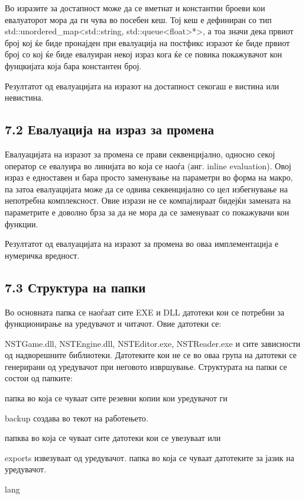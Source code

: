 Во изразите за достапност може да се вметнат и константни броеви кои евалуаторот мора да ги чува во посебен кеш. Тој кеш е дефиниран со тип std::unordered\_map<std::string, std::queue<float>*>, а тоа значи дека првиот број кој ќе биде пронајден при евалуација на постфикс изразот ќе биде првиот број со кој ќе биде евалуиран некој израз кога ќе се повика покажувачот кон фунцкијата која бара константен број.

Резултатот од евалуацијата на изразот на достапност секогаш е вистина или невистина.

\subsection{7.2 Евалуација на израз за промена}

Евалуацијата на изразот за промена се прави секвенцијално, односно секој оператор се евалуира во линијата во која се наоѓа (анг. inline evaluation). Овој израз е едноставен и бара просто заменување на параметри во форма на макро, па затоа евалуацијата може да се одвива секвенцијално со цел избегнување на непотребна комплексност. Овие изрази не се компајлираат бидејќи замената на параметрите е доволно брза за да не мора да се заменуваат со покажувачи кон функции.

Резултатот од евалуацијата на изразот за промена во оваа имплементација е нумеричка вредност.

\subsection{7.3 Структура на папки}

Во основната папка се наоѓаат сите EXE и DLL датотеки кои се потребни за функционирање на уредувачот и читачот. Овие датотеки се:

NSTGame.dll, NSTEngine.dll, NSTEditor.exe, NSTReader.exe и сите зависности од надворешните библиотеки. Датотеките кои не се во оваа група на датотеки се генерирани од уредувачот при неговото извршување. Структурата на папки се состои од папките:

папка во која се чуваат сите резевни копии кои уредувачот ги

backup создава во текот на работењето.

папква во која се чуваат сите датотеки кои се увезуваат или

exports извезуваат од уредувачот. папка во која се чуваат датотеките за јазик на уредувачот.

lang

